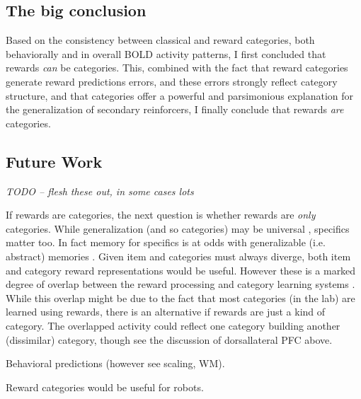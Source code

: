 \documentclass[doc,12pt]{apa}        %
\begin{document}
\subsection{The big conclusion}
Based on the consistency between classical and reward categories, both behaviorally and in overall BOLD activity patterns, I first concluded that rewards \emph{can} be categories.  This, combined with the fact that reward categories generate reward predictions errors, and these errors strongly reflect category structure, and that categories offer a powerful and parsimonious explanation for the generalization of secondary reinforcers, I finally conclude that rewards \emph{are} categories.


\subsection{Future Work}
\label{sub:future}

\emph{TODO -- flesh these out, in some cases lots}

If rewards are categories, the next question is whether rewards are \emph{only} categories.  While generalization (and so categories) may be universal \cite{Shepard:1987p9102}, specifics matter too.  In fact memory for specifics is at odds with generalizable (i.e. abstract) memories \cite{Atallah:2004p5466}. Given item and categories must always diverge, both item and category reward representations would be useful.  However these is a marked degree of overlap between the reward processing and category learning systems \cite{Seger:2010p7189,Ashby:2011p9148}.  While this overlap might be due to the fact that most categories (in the lab) are learned using rewards, there is an alternative if rewards are just a kind of category.  The overlapped activity could reflect one category building another (dissimilar) category, though see the discussion of dorsallateral PFC above.

Behavioral predictions (however see scaling, WM).

Reward categories would be useful for robots.

\clearpage
\newpage

\end{document}
